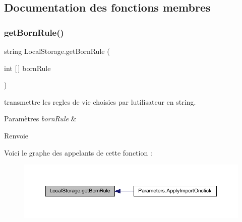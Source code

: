 \subsection{Documentation des fonctions membres}
\mbox{\label{class_local_storage_a64ead0288876a2aa3fbb7d86d3d68cc5}} 
\subsubsection{\texorpdfstring{get\+Born\+Rule()}{getBornRule()}}
{\footnotesize\ttfamily string Local\+Storage.\+get\+Born\+Rule (\begin{DoxyParamCaption}\item[{int \mbox{[}$\,$\mbox{]}}]{born\+Rule }\end{DoxyParamCaption})\hspace{0.3cm}{\ttfamily [inline]}}



transmettre les regles de vie choisies par l\textquotesingle{}utilisateur en string. 


\begin{DoxyParams}{Paramètres}
{\em born\+Rule} & \\
\hline
\end{DoxyParams}
\begin{DoxyReturn}{Renvoie}

\end{DoxyReturn}
Voici le graphe des appelants de cette fonction \+:\nopagebreak
\begin{figure}[H]
\begin{center}
\leavevmode
\includegraphics[width=350pt]{class_local_storage_a64ead0288876a2aa3fbb7d86d3d68cc5_icgraph}
\end{center}
\end{figure}
\mbox{\label{class_local_storage_ab5a516f6f13a01e683b6b1c56b373937}} 
